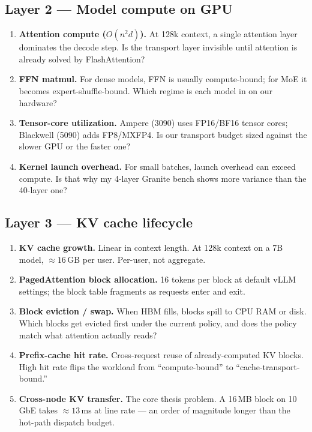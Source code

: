 \documentclass[11pt]{article}
\begin{document}
\subsection*{Layer 2 --- Model compute on GPU}
\begin{enumerate}[resume]
\item \textbf{Attention compute ($O(n^2 d)$).} At 128k context, a
single attention layer dominates the decode step. Is the transport
layer invisible until attention is already solved by FlashAttention?
\item \textbf{FFN matmul.} For dense models, FFN is usually compute-bound;
for MoE it becomes expert-shuffle-bound. Which regime is each model
in on our hardware?
\item \textbf{Tensor-core utilization.} Ampere (3090) uses FP16/BF16
tensor cores; Blackwell (5090) adds FP8/MXFP4. Is our transport
budget sized against the slower GPU or the faster one?
\item \textbf{Kernel launch overhead.} For small batches, launch
overhead can exceed compute. Is that why my 4-layer Granite bench
shows more variance than the 40-layer one?
\end{enumerate}

\subsection*{Layer 3 --- KV cache lifecycle}
\begin{enumerate}[resume]
\item \textbf{KV cache growth.} Linear in context length. At 128k
context on a 7B model, $\approx 16$\,GB per user. Per-user, not
aggregate.
\item \textbf{PagedAttention block allocation.} 16 tokens per block
at default vLLM settings; the block table fragments as requests
enter and exit.
\item \textbf{Block eviction / swap.} When HBM fills, blocks spill
to CPU RAM or disk. Which blocks get evicted first under the current
policy, and does the policy match what attention actually reads?
\item \textbf{Prefix-cache hit rate.} Cross-request reuse of
already-computed KV blocks. High hit rate flips the workload from
``compute-bound'' to ``cache-transport-bound.''
\item \textbf{Cross-node KV transfer.} The core thesis problem. A
16\,MB block on 10\,GbE takes $\approx 13$\,ms at line rate --- an
order of magnitude longer than the hot-path dispatch budget.
\end{enumerate}
\end{document}
